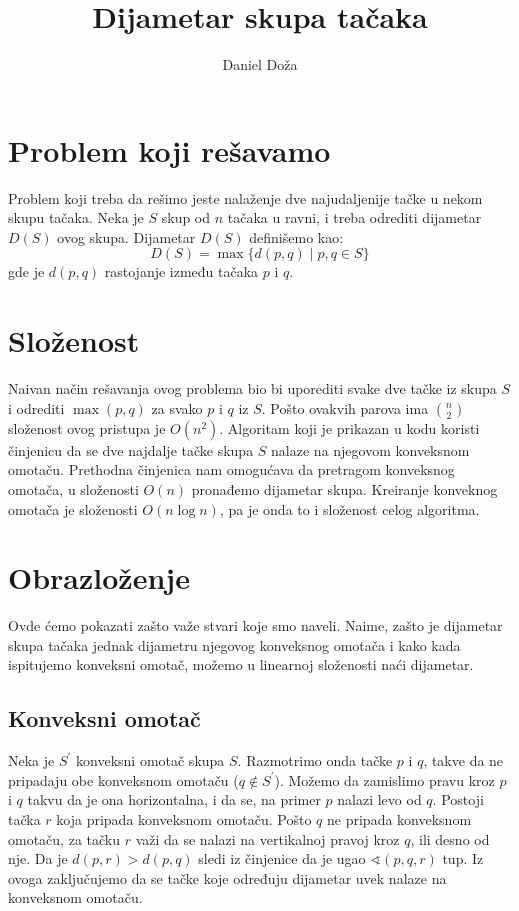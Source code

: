 \documentclass[a4paper]{article}
\begin{document}
\title{Dijametar skupa tačaka}

\author{Daniel Doža}


\maketitle


\section{Problem koji rešavamo}
Problem koji treba da rešimo jeste nalaženje dve najudaljenije tačke u nekom skupu
tačaka. Neka je \(S\) skup od \(n\) tačaka u ravni, i treba odrediti dijametar \(D(S)\)
ovog skupa. Dijametar \(D(S)\)  definišemo kao:
\[
    D(S) = \max\{d(p, q) \mid  p, q \in S\}
\]
gde je \(d(p, q)\) rastojanje između tačaka \(p \) i \(q \).


\section{Složenost}
Naivan način rešavanja ovog problema bio bi uporediti svake dve tačke iz skupa \(S\) i odrediti
\(\max(p, q)\) za svako \(p\) i \(q\) iz \(S\). Pošto ovakvih parova ima \({n \choose 2}\)
složenost ovog pristupa je \(O(n^{2})\). Algoritam koji je prikazan u kodu koristi činjenicu da
se dve najdalje tačke skupa \(S\) nalaze na njegovom konveksnom omotaču. Prethodna činjenica
nam omogućava da pretragom konveksnog omotača, u složenosti \(O(n)\) pronađemo dijametar skupa.
Kreiranje konveknog omotača je složenosti \(O(n\log{n})\), pa je onda to i složenost celog
algoritma.

\section{Obrazloženje}
Ovde ćemo pokazati zašto važe stvari koje smo naveli. Naime, zašto je dijametar skupa tačaka
jednak dijametru njegovog konveksnog omotača i kako kada ispitujemo konveksni omotač, možemo
u linearnoj složenosti naći dijametar.

\subsection{Konveksni omotač}
Neka je \(S^{'}\) konveksni omotač skupa \(S\). Razmotrimo onda tačke \(p\) i \(q\), takve da
ne pripadaju obe konveksnom omotaču (\(q \notin S^{\prime}\)). Možemo da zamislimo pravu kroz \(p\)
i \(q\) takvu da je ona horizontalna, i da se, na primer \(p\) nalazi levo od \(q\). Postoji tačka
\(r\) koja pripada konveksnom omotaču. Pošto \(q\) ne pripada konveksnom omotaču, za tačku \(r\)
važi da se nalazi na vertikalnoj pravoj kroz \(q\), ili desno od nje. Da je \(d(p, r) > d(p, q)\)
sledi iz činjenice da je ugao \(\sphericalangle(p, q, r)\) tup. Iz ovoga zaključujemo da se tačke
koje određuju dijametar uvek nalaze na konveksnom omotaču.
\end{document}
